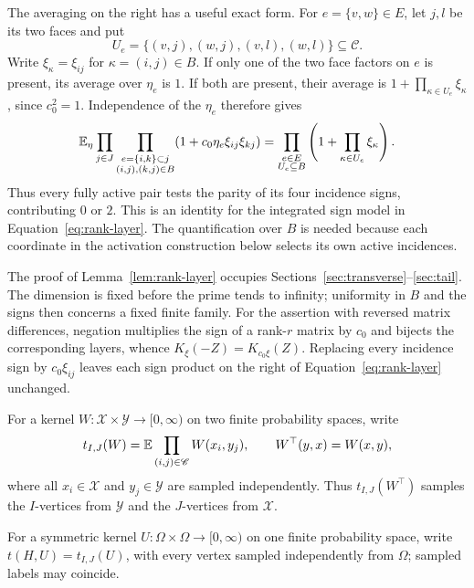 The averaging on the right has a useful exact form. For
\(e=\{v,w\}\in E\), let \(j,l\) be its two faces and put
\begin{equation}
 U_e=\{(v,j),(w,j),(v,l),(w,l)\}\subseteq\mathscr C.
 \label{eq:kernel-four-corners}
\end{equation}
Write \(\xi_\kappa=\xi_{ij}\) for \(\kappa=(i,j)\in B\).
If only one of the two face factors on \(e\) is present, its average
over \(\eta_e\) is \(1\). If both are present, their average is
\(1+\prod_{\kappa\in U_e}\xi_\kappa\), since \(c_0^2=1\).
Independence of the \(\eta_e\) therefore gives
\begin{equation}
 \mathbb E_\eta\prod_{j\in J}
 \prod_{\substack{e=\{i,k\}\subset j\\(i,j),(k,j)\in B}}
 (1+c_0\eta_e\xi_{ij}\xi_{kj})
 =
 \prod_{\substack{e\in E\\U_e\subseteq B}}
 \left(1+\prod_{\kappa\in U_e}\xi_\kappa\right).
 \label{eq:kernel-parity-model}
\end{equation}
Thus every fully active pair tests the parity of its four incidence
signs, contributing \(0\) or \(2\). This is an identity for the
integrated sign model in Equation~\eqref{eq:rank-layer}. The
quantification over \(B\) is needed because each coordinate in the
activation construction below selects its own active incidences.

The proof of Lemma~\ref{lem:rank-layer} occupies
Sections~\ref{sec:transverse}--\ref{sec:tail}.
The dimension is fixed before the prime tends to infinity; uniformity
in $B$ and the signs then concerns a fixed finite family. For the
assertion with reversed matrix differences, negation multiplies the sign of a rank-$r$ matrix by
$c_0$ and bijects the corresponding layers, whence
$K_\xi(-Z)=K_{c_0\xi}(Z)$. Replacing every incidence sign by
$c_0\xi_{ij}$ leaves each sign product on the right of
Equation~\eqref{eq:rank-layer} unchanged.

For a kernel $W:\mathcal X\times\mathcal Y\to[0,\infty)$ on two
finite probability spaces, write
\begin{equation}
 t_{I,J}(W)=\mathbb E\prod_{(i,j)\in\mathscr C}W(x_i,y_j),
 \qquad W^\top(y,x)=W(x,y),
 \label{eq:kernel-bipartite-density}
\end{equation}
where all $x_i\in\mathcal X$ and $y_j\in\mathcal Y$ are sampled
independently. Thus $t_{I,J}(W^\top)$ samples the $I$-vertices from
$\mathcal Y$ and the $J$-vertices from $\mathcal X$.

For a symmetric kernel $U:\Omega\times\Omega\to[0,\infty)$ on one
finite probability space, write $t(H,U)=t_{I,J}(U)$, with every vertex
sampled independently from $\Omega$; sampled labels may coincide.

